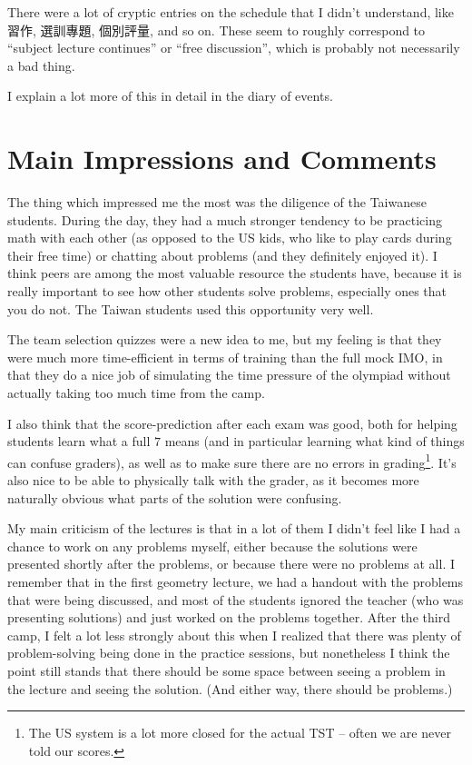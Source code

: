 \documentclass[11pt]{scrreprt}
\begin{document}
There were a lot of cryptic entries on the schedule that I didn't understand, like 習作, 選訓專題, 個別評量, and so on. These seem to roughly correspond to ``subject lecture continues'' or ``free discussion'', which is probably not necessarily a bad thing.

I explain a lot more of this in detail in the diary of events.

\section{Main Impressions and Comments}
The thing which impressed me the most was the diligence of the Taiwanese students. During the day, they had a much stronger tendency to be practicing math with each other (as opposed to the US kids, who like to play cards during their free time) or chatting about problems (and they definitely enjoyed it). I think peers are among the most valuable resource the students have, because it is really important to see how other students solve problems, especially ones that you do not. The Taiwan students used this opportunity very well.

The team selection quizzes were a new idea to me, but my feeling is that they were much more time-efficient in terms of training than the full mock IMO, in that they do a nice job of simulating the time pressure of the olympiad without actually taking too much time from the camp.

I also think that the score-prediction after each exam was good, both for helping students learn what a full $7$ means (and in particular learning what kind of things can confuse graders), as well as to make sure there are no errors in grading\footnote{The US system is a lot more closed for the actual TST -- often we are never told our scores.}.
It's also nice to be able to physically talk with the grader, as it becomes more naturally obvious what parts of the solution were confusing.

My main criticism of the lectures is that in a lot of them I didn't feel like I had a chance to work on any problems myself, either because the solutions were presented shortly after the problems, or because there were no problems at all. I remember that in the first geometry lecture, we had a handout with the problems that were being discussed, and most of the students ignored the teacher (who was presenting solutions) and just worked on the problems together. After the third camp, I felt a lot less strongly about this when I realized that there was plenty of problem-solving being done in the practice sessions, but nonetheless I think the point still stands that there should be some space between seeing a problem in the lecture and seeing the solution. (And either way, there should be problems.)
\end{document}
